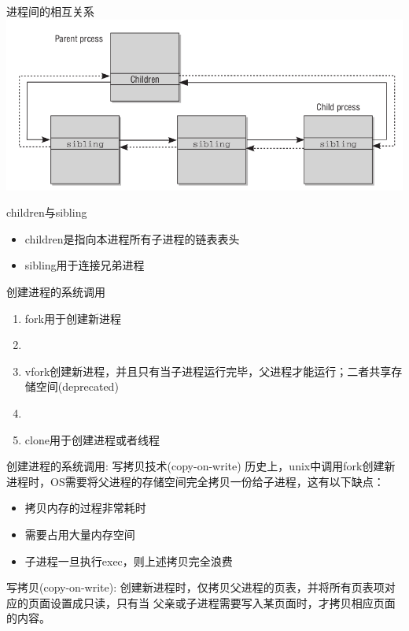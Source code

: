 \documentclass[xcolor=svgnames]{beamer}
\begin{document}
\begin{CJK*}{UTF8}{gbsn}
\begin{frame}{进程间的相互关系}
\includegraphics[width=1.0\textwidth]{parent.png}
\begin{block}{children与sibling}
\begin{itemize}
\item children是指向本进程所有子进程的链表表头
\item sibling用于连接兄弟进程
\end{itemize}
\end{block}
\end{frame}

\begin{frame}{创建进程的系统调用}
\begin{enumerate}
\item fork用于创建新进程
\item[]
\item vfork创建新进程，并且只有当子进程运行完毕，父进程才能运行；二者共享存储空间(deprecated)
\item[]
\item clone用于创建进程或者线程

\end{enumerate}
\end{frame}

\begin{frame}{创建进程的系统调用: 写拷贝技术(copy-on-write)}
历史上，unix中调用fork创建新进程时，OS需要将父进程的存储空间完全拷贝一份给子进程，这有以下缺点：
\begin{itemize}
\item 拷贝内存的过程非常耗时
\item 需要占用大量内存空间
\item 子进程一旦执行exec，则上述拷贝完全浪费
\end{itemize}

写拷贝(copy-on-write): 创建新进程时，仅拷贝父进程的页表，并将所有页表项对应的页面设置成只读，只有当
父亲或子进程需要写入某页面时，才拷贝相应页面的内容。
\end{frame}


\end{CJK*}
\end{document}
